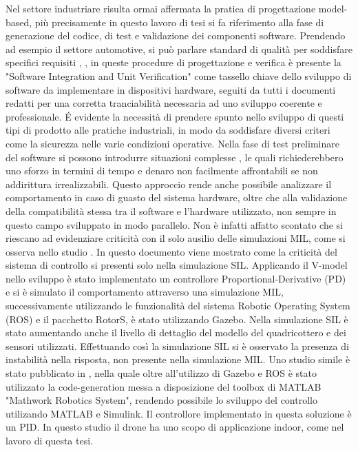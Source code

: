 Nel settore industriare risulta ormai affermata la pratica di progettazione model-based, più precisamente in questo lavoro di tesi si fa riferimento alla fase di generazione del codice, di test e validazione dei componenti software. Prendendo ad esempio il settore automotive, si può parlare standard di qualità  per soddisfare specifici requisiti \cite{iso26262}, \cite{AutoSPICE}, in queste procedure di progettazione e verifica è presente la "Software Integration and Unit Verification" come tassello chiave dello sviluppo di software da implementare in dispositivi hardware, seguiti da tutti i documenti redatti per una corretta tranciabilità necessaria ad uno sviluppo coerente e professionale. \'E evidente la necessità di prendere spunto nello sviluppo di questi tipi di prodotto alle pratiche industriali, in modo da soddisfare diversi criteri come la sicurezza nelle varie condizioni operative. Nella fase di test preliminare del software si possono introdurre situazioni complesse \cite{MIL_Auto}, le quali richiederebbero uno sforzo in termini di tempo e denaro non facilmente affrontabili se non addirittura irrealizzabili. Questo approccio rende anche possibile analizzare il comportamento in caso di guasto del sistema hardware, oltre che alla validazione della compatibilità stessa tra il software e l'hardware utilizzato, non sempre in questo campo sviluppato in modo parallelo.
Non è infatti affatto scontato che si riescano ad evidenziare criticità con il solo ausilio delle simulazioni MIL, come si osserva nello studio \cite{SIL_Improv}. In questo documento viene mostrato come la criticità del sistema di controllo si presenti solo nella simulazione SIL. Applicando il V-model nello sviluppo è stato implementato un controllore Proportional-Derivative (PD) e si è simulato il comportamento attraverso una simulazione MIL, successivamente utilizzando le funzionalità del sistema Robotic Operating System (ROS) e il pacchetto RotorS, è stato utilizzando Gazebo. Nella simulazione SIL è stato aumentando anche il livello di dettaglio del modello del quadricottero e dei sensori utilizzati. Effettuando così la simulazione SIL si è osservato la presenza di instabilità nella risposta, non presente nella simulazione MIL.
Uno studio simile è stato pubblicato in \cite{CrazyS}, nella quale oltre all'utilizzo di Gazebo e ROS è stato utilizzato la code-generation messa a disposizione del toolbox di MATLAB "Mathwork Robotics System", rendendo possibile lo sviluppo del controllo utilizando MATLAB e Simulink. Il controllore implementato in questa soluzione è un PID. In questo studio il drone ha uno scopo di applicazione indoor, come nel lavoro di questa tesi.
